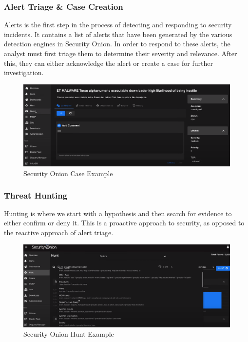 \subsubsection{Alert Triage \& Case Creation}
Alerts is the first step in the process of detecting and responding to security incidents.
It contains a list of alerts that have been generated by the various detection engines in Security Onion.
In order to respond to these alerts, the analyst must first triage them to determine their severity and relevance.
After this, they can either acknowledge the alert or create a case for further investigation.

\begin{figure}[H]
    \centering
    \includegraphics[width=1\textwidth]{src/assets/images/security-onion-cases.png}
    \caption{Security Onion Case Example}
\end{figure}

\subsubsection{Threat Hunting}
Hunting is where we start with a hypothesis and then search for evidence to either confirm or deny it.
This is a proactive approach to security, as opposed to the reactive approach of alert triage.

\begin{figure}[H]
    \centering
    \includegraphics[width=1\textwidth]{src/assets/images/security-onion-hunt.png}
    \caption{Security Onion Hunt Example}
\end{figure}

